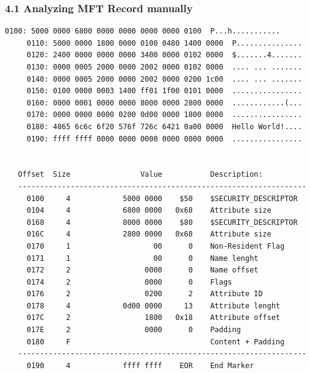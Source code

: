 \begin{frame}[fragile]
  \frametitle{4.1 Analyzing MFT Record manually}
  \begin{lstlisting}[basicstyle=\tiny]
     0100: 5000 0000 6800 0000 0000 0000 0000 0100  P...h...........
     0110: 5000 0000 1800 0000 0100 0480 1400 0000  P...............
     0120: 2400 0000 0000 0000 3400 0000 0102 0000  $.......4.......
     0130: 0000 0005 2000 0000 2002 0000 0102 0000  .... ... .......
     0140: 0000 0005 2000 0000 2002 0000 0200 1c00  .... ... .......
     0150: 0100 0000 0003 1400 ff01 1f00 0101 0000  ................
     0160: 0000 0001 0000 0000 8000 0000 2800 0000  ............(...
     0170: 0000 0000 0000 0200 0d00 0000 1800 0000  ................
     0180: 4865 6c6c 6f20 576f 726c 6421 0a00 0000  Hello World!....
     0190: ffff ffff 0000 0000 0000 0000 0000 0000  ................


   Offset  Size                Value           Description:
   ------------------------------------------------------------------
     0100     4            5000 0000    $50    $SECURITY_DESCRIPTOR
     0104     4            6800 0000   0x68    Attribute size
     0168     4            8000 0000    $80    $SECURITY_DESCRIPTOR
     016C     4            2800 0000   0x68    Attribute size
     0170     1                   00      0    Non-Resident Flag
     0171     1                   00      0    Name lenght
     0172     2                 0000      0    Name offset
     0174     2                 0000      0    Flags
     0176     2                 0200      2    Attribute ID
     0178     4            0d00 0000     13    Attribute lenght
     017C     2                 1800   0x18    Attribute offset
     017E     2                 0000      0    Padding
     0180     F                                Content + Padding
   ------------------------------------------------------------------
     0190     4            ffff ffff    EOR    End Marker
  \end{lstlisting}
\end{frame}


